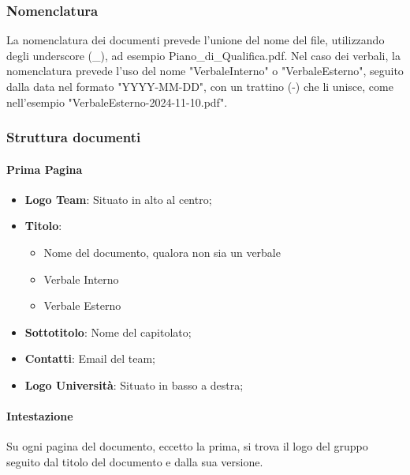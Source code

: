 \documentclass[10pt]{article}
\begin{document}
\begin{justify}
    \subsubsection{Nomenclatura}
    La nomenclatura dei documenti prevede l'unione del nome del file, utilizzando degli underscore (\_), ad esempio Piano\_di\_Qualifica.pdf.
    Nel caso dei verbali, la nomenclatura prevede l'uso del nome "VerbaleInterno" o "VerbaleEsterno", seguito dalla data nel formato "YYYY-MM-DD", con un trattino (-) che li unisce, come nell'esempio "VerbaleEsterno-2024-11-10.pdf".\\

    \subsubsection{Struttura documenti}

        \paragraph{Prima Pagina}
        \begin{itemize}
            \item \textbf{Logo Team}: Situato in alto al centro;
            \item \textbf{Titolo}: \begin{itemize}
            \item Nome del documento, qualora non sia un verbale
            \item Verbale Interno
            \item Verbale Esterno
            \end{itemize}
            \item\textbf{Sottotitolo}: Nome del capitolato;
            \item\textbf{Contatti}: Email del team;
            \item\textbf{Logo Università}: Situato in basso a destra;
        \end{itemize}

        \paragraph{Intestazione}
        Su ogni pagina del documento, eccetto la prima, si trova il logo del gruppo seguito dal titolo del documento e dalla sua versione.\\


\end{justify}
\end{document}
